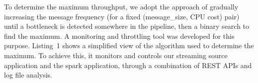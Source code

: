 \documentclass[conference]{IEEEtran}
\begin{document}
To determine the maximum throughput, we adopt the approach of gradually increasing the message frequency (for a fixed (message\_size, CPU cost) pair) until a bottleneck is detected somewhere in the pipeline, then a binary search to find the maximum. A monitoring and throttling tool was developed for this purpose. Listing~1 shows a simplified view of the algorithm used to determine the maximum. To achieve this, it monitors and controls our streaming source application and the spark application, through a combination of REST APIs and log file analysis. 









\end{document}
